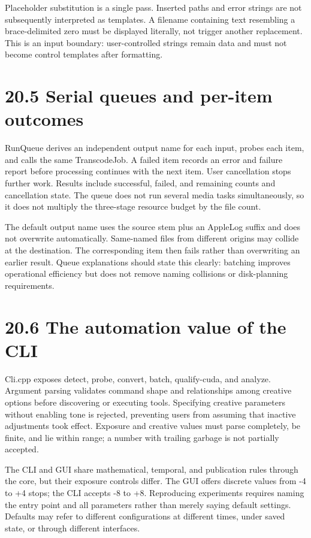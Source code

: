 \documentclass[11pt,a4paper,openany]{book}
\begin{document}
Placeholder substitution is a single pass. Inserted paths and error strings are not subsequently interpreted as templates. A filename containing text resembling a brace-delimited zero must be displayed literally, not trigger another replacement. This is an input boundary: user-controlled strings remain data and must not become control templates after formatting.


\section*{20.5 Serial queues and per-item outcomes}
RunQueue derives an independent output name for each input, probes each item, and calls the same TranscodeJob. A failed item records an error and failure report before processing continues with the next item. User cancellation stops further work. Results include successful, failed, and remaining counts and cancellation state. The queue does not run several media tasks simultaneously, so it does not multiply the three-stage resource budget by the file count.

The default output name uses the source stem plus an AppleLog suffix and does not overwrite automatically. Same-named files from different origins may collide at the destination. The corresponding item then fails rather than overwriting an earlier result. Queue explanations should state this clearly: batching improves operational efficiency but does not remove naming collisions or disk-planning requirements.


\section*{20.6 The automation value of the CLI}
Cli.cpp exposes detect, probe, convert, batch, qualify-cuda, and analyze. Argument parsing validates command shape and relationships among creative options before discovering or executing tools. Specifying creative parameters without enabling tone is rejected, preventing users from assuming that inactive adjustments took effect. Exposure and creative values must parse completely, be finite, and lie within range; a number with trailing garbage is not partially accepted.

The CLI and GUI share mathematical, temporal, and publication rules through the core, but their exposure controls differ. The GUI offers discrete values from -4 to +4 stops; the CLI accepts -8 to +8. Reproducing experiments requires naming the entry point and all parameters rather than merely saying default settings. Defaults may refer to different configurations at different times, under saved state, or through different interfaces.
\end{document}
